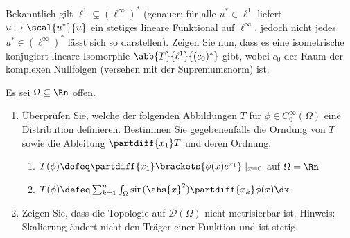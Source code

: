 \begin{exercisePage}
	\setcounter{taskcount}{21}
	
	\begin{exercise}
		Bekanntlich gilt $\ell^1 \subsetneq (\ell^\infty)^\ast$ (genauer: für alle $u^\ast \in \ell^1$ liefert $u \mapsto \scal{u^\ast}{u}$ ein stetiges lineare Funktional auf $\ell^\infty$, jedoch nicht jedes $u^\ast \in (\ell^\infty)^\ast$ lässt sich so darstellen). Zeigen Sie nun, dass es eine isometrische konjugiert-lineare Isomorphie $\abb{T}{\ell^1}{(c_0)^\ast}$ gibt, wobei $c_0$ der Raum der komplexen Nullfolgen (versehen mit der Supremumsnorm) ist.
	\end{exercise}

	\begin{exercise}
		Es sei $\Omega \subseteq \Rn$ offen.
		\begin{enumerate}[nolistsep]
			\item Überprüfen Sie, welche der folgenden Abbildungen $T$ für $\phi \in C_0^\infty(\Omega)$ eine Distribution definieren. Bestimmen Sie gegebenenfalls die Orndung von $T$ sowie die Ableitung $\partdiff{x_1} T$ und deren Ordnung.
			\begin{enumerate}[label=(\roman*)]
				\item $T(\phi) \defeq \partdiff{x_1} \brackets{\phi(x) e^{x_1}} \mid_{x = 0}$ auf $\Omega = \Rn$
				\item $T(\phi) \defeq \sum_{k=1}^n \int_\Omega \sin(\abs{x}^2) \partdiff{x_k}\phi(x) \dx$
			\end{enumerate}
		\item Zeigen Sie, dass die Topologie auf $\mathcal{D}(\Omega)$ nicht metrisierbar ist. Hinweis: Skalierung ändert nicht den Träger einer Funktion und ist stetig.
		\end{enumerate}
	\end{exercise}


\end{exercisePage}
